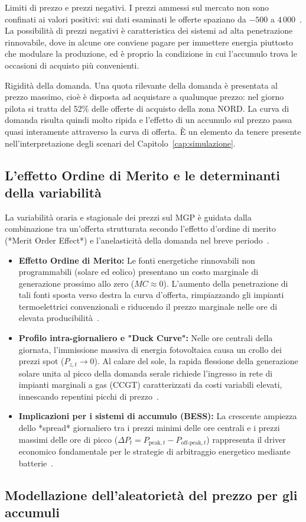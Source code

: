Limiti di prezzo e prezzi negativi. I prezzi ammessi sul mercato non sono
confinati ai valori positivi: sui dati esaminati le offerte spaziano da $-500$ a
$4\,000$~\euromwh{}. La possibilit\`a di prezzi negativi \`e caratteristica dei sistemi ad
alta penetrazione rinnovabile, dove in alcune ore conviene pagare per immettere energia
piuttosto che modulare la produzione, ed \`e proprio la condizione in cui l'accumulo trova le
occasioni di acquisto pi\`u convenienti.

Rigidit\`a della domanda. Una quota rilevante della domanda \`e presentata al
prezzo massimo, cio\`e \`e disposta ad acquistare a qualunque prezzo: nel giorno pilota si
tratta del 52\% delle offerte di acquisto della zona NORD. La curva di domanda risulta quindi
molto ripida e l'effetto di un accumulo sul prezzo passa quasi interamente attraverso la
curva di offerta. \`E un elemento da tenere presente nell'interpretazione degli scenari del
Capitolo~\ref{cap:simulazione}.


\subsection{L'effetto Ordine di Merito e le determinanti della variabilità}
La variabilità oraria e stagionale dei prezzi sul \ac{MGP} è guidata dalla combinazione tra un'offerta strutturata secondo l'effetto d'ordine di merito (*Merit Order Effect*) e l'anelasticità della domanda nel breve periodo~\cite{sensfuss_2008}.

\begin{itemize}
    \item \textbf{Effetto Ordine di Merito:} Le fonti energetiche rinnovabili non programmabili (solare ed eolico) presentano un costo marginale di generazione prossimo allo zero ($MC \approx 0$). L'aumento della penetrazione di tali fonti sposta verso destra la curva d'offerta, rimpiazzando gli impianti termoelettrici convenzionali e riducendo il prezzo marginale nelle ore di elevata producibilità~\cite{sensfuss_2008, creti_2018}.
    \item \textbf{Profilo intra-giornaliero e "Duck Curve":} Nelle ore centrali della giornata, l'immissione massiva di energia fotovoltaica causa un crollo dei prezzi spot ($P_{z,t} \to 0$). Al calare del sole, la rapida flessione della generazione solare unita al picco della domanda serale richiede l'ingresso in rete di impianti marginali a gas (CCGT) caratterizzati da costi variabili elevati, innescando repentini picchi di prezzo~\cite{creti_2018}.
    \item \textbf{Implicazioni per i sistemi di accumulo (\ac{BESS}):} La crescente ampiezza dello *spread* giornaliero tra i prezzi minimi delle ore centrali e i prezzi massimi delle ore di picco ($\Delta P_t = P_{\text{peak},t} - P_{\text{off-peak},t}$) rappresenta il driver economico fondamentale per le strategie di arbitraggio energetico mediante batterie~\cite{creti_2018}.
\end{itemize}
\subsection{Modellazione dell'aleatorietà del prezzo per gli accumuli}